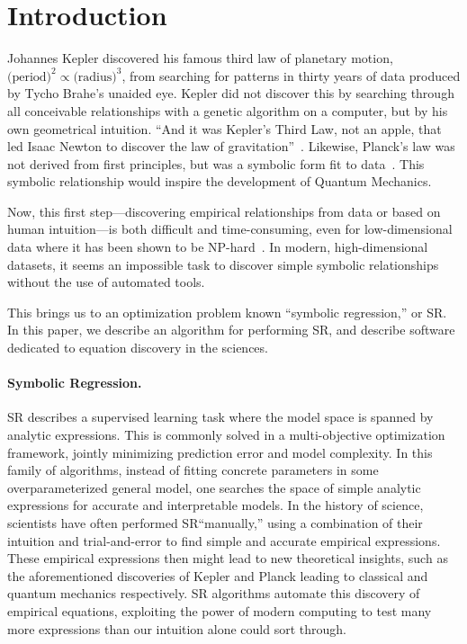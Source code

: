 \documentclass[letterpaper,twocolumn]{scrartcl}
\newcommand\we{we\xspace}
\newcommand\sr{SR\xspace}
\newcommand\Sr{SR\xspace}
\begin{document}
\section{Introduction}
\label{sec:intro_pysr}







Johannes Kepler discovered his famous third law of planetary motion, $\text{(period)}^2 \propto \text{(radius)}^3$, from searching for patterns in thirty years of data produced by Tycho Brahe's unaided eye.
Kepler did not discover this by searching through all conceivable relationships with a genetic algorithm on a computer, but by his own geometrical intuition. 
``And it was Kepler's Third Law, not an apple, that led Isaac Newton to discover the law of gravitation''~\cite{hawkingShouldersGiantsGreat2004}.
Likewise, Planck's law was not derived from first principles, but was a symbolic form fit to data~\cite{planckUeberVerbesserungWien1900}.
This symbolic relationship would inspire the development of Quantum Mechanics.

Now, this first step---discovering empirical relationships from data or based on human intuition---is both difficult and time-consuming, even for low-dimensional data where it has been shown to be NP-hard~\cite{virgolinSymbolicRegressionNPhard2022}.
In modern, high-dimensional datasets, it seems an impossible task to discover simple symbolic relationships without the use of automated tools.

This brings us to an optimization problem known ``symbolic regression,'' or SR.
In this paper, \we describe an algorithm for performing \sr, and describe software dedicated to equation discovery in the sciences.

\paragraph{Symbolic Regression.}
\Sr describes a supervised learning task where the model space is spanned by analytic expressions.
This is commonly solved in a multi-objective optimization framework, jointly minimizing prediction error and model complexity.
In this family of algorithms, instead of fitting concrete parameters in some overparameterized general model, one searches the space of simple analytic expressions for accurate and interpretable models.
In the history of science, scientists have often performed \sr ``manually,'' using a combination of their intuition and trial-and-error to find simple and accurate empirical expressions.
These empirical expressions then might lead to new theoretical insights, such as the aforementioned discoveries of Kepler and Planck leading to classical and quantum mechanics respectively.
\Sr algorithms automate this discovery of empirical equations, exploiting the power of modern computing to test many more expressions than our intuition alone could sort through.
\end{document}
